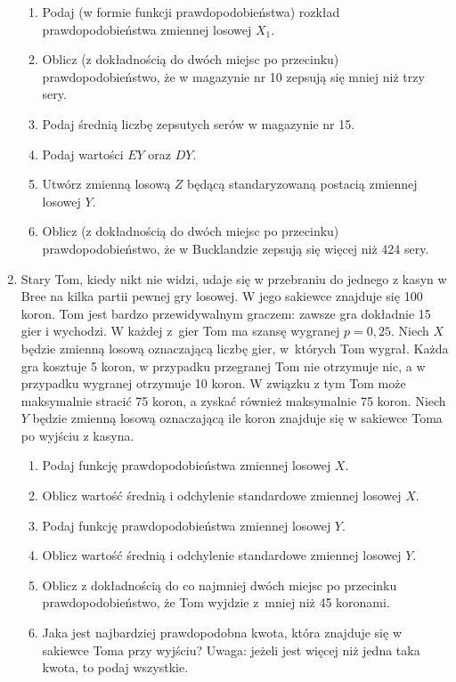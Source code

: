 \documentclass{mwart}
\begin{document}
\begin{enumerate}
\begin{enumerate}
\item Podaj  (w formie funkcji prawdopodobieństwa) rozkład prawdopodobieństwa zmiennej losowej $X_1$.
\item Oblicz (z dokładnością do dwóch miejsc po przecinku) prawdopodobieństwo, że w magazynie nr 10 zepsują się mniej niż trzy sery.
\item Podaj średnią liczbę zepsutych serów w magazynie nr 15.
\item Podaj wartości $EY$ oraz $DY$.
\item Utwórz zmienną losową $Z$ będącą standaryzowaną postacią zmiennej losowej $Y$.
\item Oblicz (z dokładnością do dwóch miejsc po przecinku) prawdopodobieństwo, że w Bucklandzie zepsują się więcej niż 424 sery.
\end{enumerate}

\item Stary Tom, kiedy nikt nie widzi, udaje się w przebraniu do jednego z kasyn w Bree na kilka partii pewnej gry losowej.
W jego sakiewce znajduje się 100 koron.
Tom jest bardzo przewidywalnym graczem: zawsze gra dokładnie 15 gier i wychodzi.
W każdej z~gier Tom ma szansę wygranej $p=0{,}25$.
Niech $X$ będzie zmienną losową oznaczającą liczbę gier, w~których Tom wygrał.
Każda gra kosztuje 5 koron, w przypadku przegranej Tom nie otrzymuje nic, a w przypadku wygranej otrzymuje 10 koron.
W związku z tym Tom może maksymalnie stracić 75 koron, a zyskać również maksymalnie 75 koron.
Niech $Y$ będzie zmienną losową oznaczającą ile koron znajduje się w sakiewce Toma po wyjściu z kasyna.

\begin{enumerate}
	\item Podaj funkcję prawdopodobieństwa zmiennej losowej $X$.
	\item Oblicz wartość średnią i odchylenie standardowe zmiennej losowej $X$.
	\item Podaj funkcję prawdopodobieństwa zmiennej losowej $Y$.
	\item Oblicz wartość średnią i odchylenie standardowe zmiennej losowej $Y$.
	\item Oblicz z dokładnością do co najmniej dwóch miejsc po przecinku prawdopodobieństwo, że Tom wyjdzie z~mniej niż 45 koronami.
	\item Jaka jest najbardziej prawdopodobna kwota, która znajduje się w sakiewce Toma przy wyjściu? Uwaga: jeżeli jest więcej
		niż jedna taka kwota, to podaj wszystkie.
\end{enumerate}


\end{enumerate}
\end{document}
